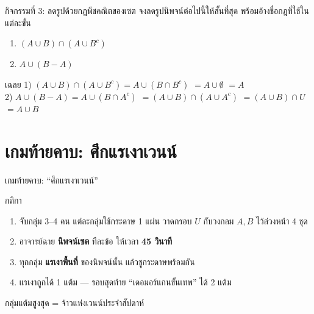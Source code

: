 \begin{frame}{กิจกรรมที่ 3: ลดรูปด้วยกฎพีชคณิตของเซต }
  จงลดรูปนิพจน์ต่อไปนี้ให้สั้นที่สุด พร้อมอ้างชื่อกฎที่ใช้ในแต่ละขั้น
  \begin{enumerate}
    \item $(A \cup B) \cap (A \cup B^c)$
    \item $A \cup (B - A)$
  \end{enumerate}
  \pause
  \begin{exampleblock}{เฉลย}
    \footnotesize
    1) $(A \cup B) \cap (A \cup B^c) = A \cup (B \cap B^c)$ 
       $= A \cup \emptyset$  $= A$  \\[0.3em]
    2) $A \cup (B - A) = A \cup (B \cap A^c)$ 
       $= (A \cup B) \cap (A \cup A^c)$ 
       $= (A \cup B) \cap U$  $= A \cup B$ 
  \end{exampleblock}
\end{frame}


\section{เกมท้ายคาบ: ศึกแรเงาเวนน์}

\begin{frame}{เกมท้ายคาบ: ``ศึกแรเงาเวนน์'' }
  \begin{block}{กติกา}
    \begin{enumerate}
      \item จับกลุ่ม 3--4 คน แต่ละกลุ่มใช้กระดาษ 1 แผ่น วาดกรอบ $U$ กับวงกลม $A, B$ ไว้ล่วงหน้า 4 ชุด
      \item อาจารย์ฉาย \textbf{นิพจน์เซต} ทีละข้อ ให้เวลา \textbf{45 วินาที}
      \item ทุกกลุ่ม \textbf{แรเงาพื้นที่} ของนิพจน์นั้น แล้วชูกระดาษพร้อมกัน
      \item แรเงาถูกได้ 1 แต้ม --- รอบสุดท้าย ``เดอมอร์แกนขั้นเทพ'' ได้ 2 แต้ม
    \end{enumerate}
  \end{block}
  \vspace{0.4em}
  \begin{exampleblock}{}
    \centering กลุ่มแต้มสูงสุด = จ้าวแห่งเวนน์ประจำสัปดาห์
  \end{exampleblock}
\end{frame}

